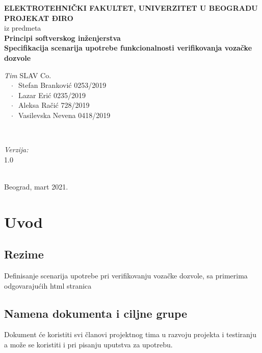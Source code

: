 \documentclass[12pt]{article}
\begin{document}
    \renewcommand{\labelenumii}{\arabic{enumi}.\arabic{enumii}}
	\begin{titlepage}  
		\center
		\textbf{ \LARGE ELEKTROTEHNIČKI FAKULTET, UNIVERZITET U BEOGRADU } \\[4cm]
		\textbf{ \Large PROJEKAT ĐIRO\texttrademark} \\[0.3cm]
		iz predmeta \\[0.3cm]
		\textbf{ \Large Principi softverskog inženjerstva} \\[0.7cm]
		{ \huge \bfseries Specifikacija scenarija upotrebe funkcionalnosti verifikovanja vozačke dozvole } \\[5.5cm]
		

		\begin{minipage}{0.5\textwidth}
			\begin{flushleft}
				\large
				\emph{Tim} SLAV Co. \\
			     $\;\;\; \cdot \;\;$Stefan Branković  0253/2019\\
			     $\;\;\; \cdot \;\;$Lazar Erić 0235/2019\\
			     $\;\;\; \cdot \;\;$Aleksa Račić 728/2019\\
			     $\;\;\; \cdot \;\;$Vasilevska Nevena 0418/2019
			\end{flushleft}
		\end{minipage}
		~
		\begin{minipage}{0.4\textwidth}
			\begin{flushright}
				\large
				\emph{Verzija:} \\
				1.0
			\end{flushright}
		\end{minipage} \\[2cm]
		\enlargethispage{4\baselineskip}
		{ \large Beograd, mart 2021. }
		\vfill
	\end{titlepage}
\pagebreak
\tableofcontents
\pagebreak



\section{Uvod}
\subsection{Rezime}
Definisanje scenarija upotrebe pri verifikovanju vozačke dozvole, sa primerima odgovarajućih html stranica
\subsection{Namena dokumenta i ciljne grupe}
Dokument će koristiti svi članovi projektnog tima u razvoju projekta i testiranju a može se koristiti i pri pisanju uputstva za
upotrebu.
\end{document}

